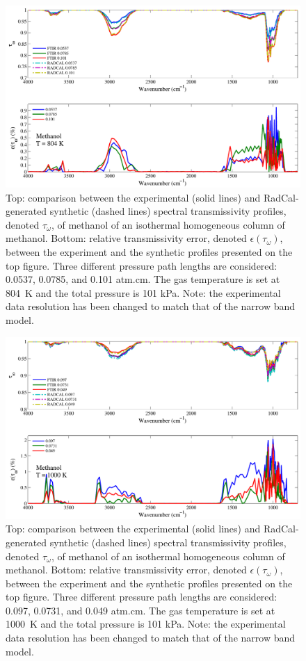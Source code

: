 \begin{figure}[p]
\includegraphics[width=\textwidth]{../Verification/Results_Test2/Methanol_804.pdf}
\caption{Top: comparison between the experimental (solid lines) and RadCal-generated synthetic (dashed lines) spectral transmissivity profiles, denoted $\tau_{\omega}$, of methanol of an isothermal homogeneous column of methanol. Bottom: relative transmissivity error, denoted $\epsilon{(\tau_{\omega})}$, between the experiment and the synthetic profiles presented on the top figure. Three different pressure path lengths are considered: 0.0537, 0.0785, and 0.101 atm.cm. The gas temperature is set at 804~K and the total pressure is 101 kPa. Note: the experimental data resolution has been changed to match that of the narrow band model. \label{fig:methanol_Verify_804K}}
\end{figure}

\begin{figure}[p]
\includegraphics[width=\textwidth]{../Verification/Results_Test2/Methanol_1000.pdf}
\caption{Top: comparison between the experimental (solid lines) and RadCal-generated synthetic (dashed lines) spectral transmissivity profiles, denoted $\tau_{\omega}$, of methanol of an isothermal homogeneous column of methanol. Bottom: relative transmissivity error, denoted $\epsilon{(\tau_{\omega})}$, between the experiment and the synthetic profiles presented on the top figure. Three different pressure path lengths are considered: 0.097, 0.0731, and 0.049 atm.cm. The gas temperature is set at 1000~K and the total pressure is 101 kPa. Note: the experimental data resolution has been changed to match that of the narrow band model. \label{fig:methanol_Verify_1000K}}
\end{figure}


